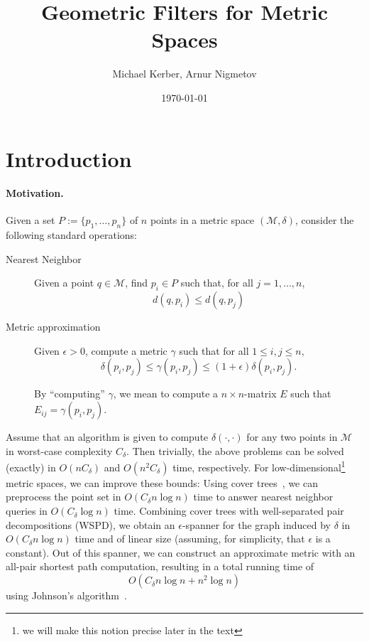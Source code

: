 \documentclass[10pt]{article}
\title{Geometric Filters for Metric Spaces}
\author{Michael Kerber, Arnur Nigmetov}
\date{\today}
\newcommand{\eps}{\epsilon}
\newcommand{\pointset}{P}
\newcommand{\metricspace}{\mathcal{M}}
\newcommand{\metric}{\delta}
\newcommand{\approxmetric}{\gamma}
\newcommand{\complexity}{C_{\metric}}
\begin{document}
\maketitle

\section{Introduction}

\paragraph{Motivation.}
%
Given a set $\pointset:=\{p_1,\ldots,p_n\}$ of $n$ points
in a metric space $(\metricspace,\metric)$, 
consider the following standard operations:

\begin{description}
\item[Nearest Neighbor] Given a point $q\in\metricspace$,
find $p_i\in\pointset$ such that, for all $j=1,\ldots,n$,
\[d(q,p_i)\leq d(q,p_j)\]

\item[Metric approximation] Given $\eps>0$, compute a metric $\approxmetric$
such that for all $1\leq i,j\leq n$,
%
\[\metric(p_i,p_j)\leq\approxmetric(p_i,p_j)\leq (1+\eps)\metric(p_i,p_j).\]

By ``computing'' $\approxmetric$, we mean to compute a $n\times n$-matrix $E$ 
such that $E_{ij}=\approxmetric(p_i,p_j)$.
\end{description}

Assume that an algorithm is given to compute $\metric(\cdot,\cdot)$
for any two points in $\metricspace$ in worst-case complexity $\complexity$.
Then trivially, the above problems can be solved (exactly) in
$O(n\complexity)$ and $O(n^2\complexity)$ time, respectively.
For low-dimensional\footnote{we will make this notion precise
later in the text} metric spaces, we can improve these bounds:
Using cover trees~\cite{cover-trees}, we can preprocess the point set
in $O(\complexity n\log n)$ time to answer nearest neighbor queries
in $O(\complexity \log n)$ time. Combining cover trees with well-separated
pair decompositions (WSPD), we obtain an $\eps$-spanner for the graph
induced by $\metric$ in $O(\complexity n\log n)$ time and
of linear size (assuming, for simplicity, that $\eps$ is a constant).
Out of this spanner,
we can construct an approximate metric
with an all-pair shortest path computation,
resulting in a total running time of
\[O(\complexity n\log n+ n^2\log n)\]
using Johnson's algorithm~\cite{johnson}.
\end{document}
